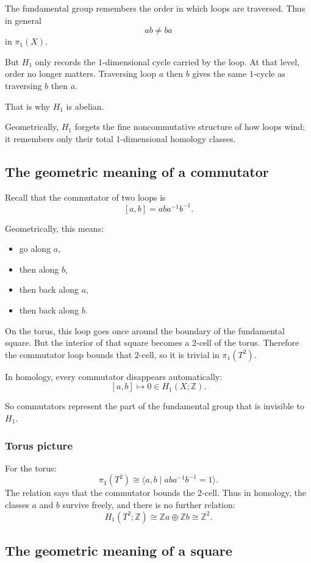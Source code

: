 \documentclass[12pt,a4paper]{article}
\newcommand{\Z}{\mathbb{Z}}
\theoremstyle{notespace}
\begin{document}
The fundamental group remembers the order in which loops are traversed. Thus in general
\[
ab\neq ba
\]
in \(\pi_1(X)\).

But \(H_1\) only records the \(1\)-dimensional cycle carried by the loop. At that level, order no longer matters. Traversing loop \(a\) then \(b\) gives the same \(1\)-cycle as traversing \(b\) then \(a\).

That is why \(H_1\) is abelian.

Geometrically, \(H_1\) forgets the fine noncommutative structure of how loops wind; it remembers only their total \(1\)-dimensional homology classes.

\subsection{The geometric meaning of a commutator}

Recall that the commutator of two loops is
\[
[a,b]=aba^{-1}b^{-1}.
\]

Geometrically, this means:
\begin{itemize}
	\item go along \(a\),
	\item then along \(b\),
	\item then back along \(a\),
	\item then back along \(b\).
\end{itemize}

On the torus, this loop goes once around the boundary of the fundamental square. But the interior of that square becomes a \(2\)-cell of the torus. Therefore the commutator loop bounds that \(2\)-cell, so it is trivial in \(\pi_1(T^2)\).

In homology, every commutator disappears automatically:
\[
[a,b]\mapsto 0 \in H_1(X;\Z).
\]

So commutators represent the part of the fundamental group that is invisible to \(H_1\).

\subsubsection*{Torus picture}

For the torus:
\[
\pi_1(T^2)\cong \langle a,b\mid aba^{-1}b^{-1}=1\rangle.
\]
The relation says that the commutator bounds the \(2\)-cell. Thus in homology, the classes \(a\) and \(b\) survive freely, and there is no further relation:
\[
H_1(T^2;\Z)\cong \Z a\oplus \Z b\cong \Z^2.
\]

\subsection{The geometric meaning of a square}
\end{document}

